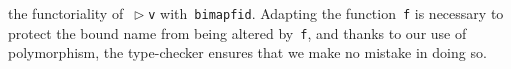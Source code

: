\documentclass[9pt,preprint,authoryear]{sigplanconf}
\begin{document}
    the functoriality of{~}\textcolor[cmyk]{0,0.65,0.99,0}{\texttt{\makebox[1.22ex][l]{$ {(} $}}}\textcolor[rgb]{0,0,0.80}{\texttt{$ \vartriangleright $}}\textcolor[rgb]{0,0,0.80}{\texttt{\mbox{\hspace{0.50em}}}}\textcolor[rgb]{0,0,0.80}{\texttt{v}}\textcolor[cmyk]{0,0.65,0.99,0}{\texttt{\makebox[1.22ex][r]{$ {)} $}}} with{~}\textcolor[rgb]{0,0,0.80}{\texttt{bimap}}\textcolor[rgb]{0,0,0.80}{\texttt{\mbox{\hspace{0.50em}}}}\textcolor[rgb]{0,0,0.80}{\texttt{f}}\textcolor[rgb]{0,0,0.80}{\texttt{\mbox{\hspace{0.50em}}}}\textcolor[rgb]{0,0,0.80}{\texttt{id}}. Adapting the
    function{~}\textcolor[rgb]{0,0,0.80}{\texttt{f}} is necessary to protect the bound name from being
    altered by{~}\textcolor[rgb]{0,0,0.80}{\texttt{f}}, and thanks to our use of polymorphism, the
    type-checker ensures that we make no mistake in doing so.%


{\nopagebreak }
\end{document}
